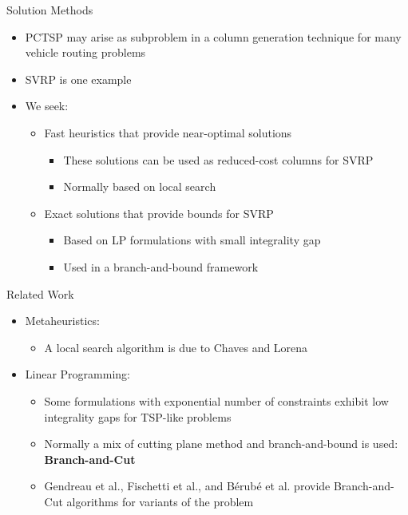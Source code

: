 \begin{frame}[t]{Solution Methods}
    \begin{itemize}
        \item<1-> PCTSP may arise as subproblem in a column generation technique for many vehicle routing problems
        \item<2-> SVRP is one example
        \item<3-> We seek:
            \begin{itemize}
                \item<4-> Fast heuristics that provide near-optimal solutions
                    \begin{itemize}
                        \item<5-> These solutions can be used as reduced-cost columns for SVRP
                        \item<6-> Normally based on local search
                    \end{itemize}
                \item<7-> Exact solutions that provide bounds for SVRP
                    \begin{itemize}
                        \item<8-> Based on LP formulations with small integrality gap
                        \item<9-> Used in a branch-and-bound framework
                    \end{itemize}
                    
            \end{itemize}
    \end{itemize}
\end{frame}


\begin{frame}[t]{Related Work}
\begin{itemize}
    \item<1-> Metaheuristics:
        \begin{itemize}
            \item<2-> A local search algorithm is due to Chaves and Lorena
        \end{itemize}
        \item<3-> Linear Programming:
        \begin{itemize}
            \item<4-> Some formulations with exponential number of constraints exhibit low integrality gaps for TSP-like problems
            \item<5-> Normally a mix of cutting plane method and branch-and-bound is used: \textbf{Branch-and-Cut}
            \item<6-> Gendreau et al., Fischetti et al., and B\'{e}rub\'{e} et al. provide Branch-and-Cut algorithms for variants of the problem
        \end{itemize}
\end{itemize}
\end{frame}

